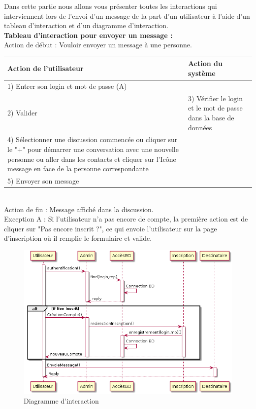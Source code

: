 	Dans cette partie nous allons vous présenter toutes les interactions qui interviennent lors de l'envoi d'un message de la part d'un utilisateur à l'aide d'un tableau d’interaction et d'un diagramme d’interaction. \\

	\textbf{Tableau d’interaction pour envoyer un message :} \\

	Action de début : Vouloir envoyer un message à une personne. \\

	\begin{tabular}{|p{7cm}|p{7cm}|}
		\hline
		Action de l'utilisateur & Action du système\tabularnewline
		\hline

		\hline
		1) Entrer son login et mot de passe (A)  & \tabularnewline

		\hline
		2) Valider  & 3) Vérifier le login et le mot de passe dans la base de données\tabularnewline

		\hline
		4) Sélectionner une discussion commencée ou cliquer sur le "+" pour	démarrer une conversation avec une nouvelle personne ou aller dans les contacts et cliquer sur l’Icône message en face de la personne correspondante & \tabularnewline

		\hline
		5) Envoyer son message  & \tabularnewline
		\hline
	\end{tabular}

~\\

	Action de fin  : Message affiché dans la discussion. \\

	Exception A : Si l'utilisateur n'a pas encore de compte, la première action est de cliquer sur "Pas encore inscrit ?", ce qui envoie l'utilisateur sur la page d'inscription où il remplie le formulaire et valide.

	\begin{figure}[H]
		\centerline{\includegraphics[width=12.5cm]{img/interaction.png}}
		\caption{Diagramme d’interaction}
	\end{figure}

